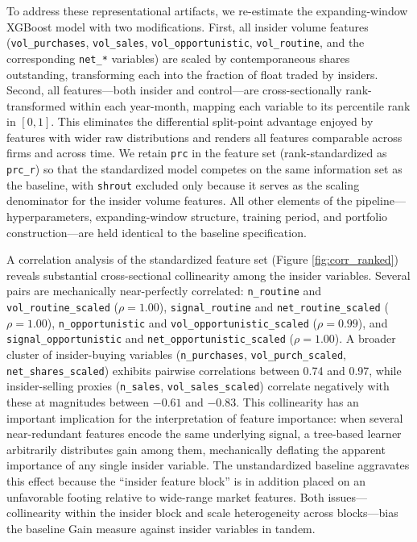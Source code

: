 \documentclass{article}
\begin{document}
To address these representational artifacts, we re-estimate the expanding-window XGBoost model with two modifications. First, all insider volume features (\texttt{vol\_purchases}, \texttt{vol\_sales}, \texttt{vol\_opportunistic}, \texttt{vol\_routine}, and the corresponding \texttt{net\_*} variables) are scaled by contemporaneous shares outstanding, transforming each into the fraction of float traded by insiders. Second, all features---both insider and control---are cross-sectionally rank-transformed within each year-month, mapping each variable to its percentile rank in $[0,1]$. This eliminates the differential split-point advantage enjoyed by features with wider raw distributions and renders all features comparable across firms and across time. We retain \texttt{prc} in the feature set (rank-standardized as \texttt{prc\_r}) so that the standardized model competes on the same information set as the baseline, with \texttt{shrout} excluded only because it serves as the scaling denominator for the insider volume features. All other elements of the pipeline---hyperparameters, expanding-window structure, training period, and portfolio construction---are held identical to the baseline specification.

A correlation analysis of the standardized feature set (Figure \ref{fig:corr_ranked}) reveals substantial cross-sectional collinearity among the insider variables. Several pairs are mechanically near-perfectly correlated: \texttt{n\_routine} and \texttt{vol\_routine\_scaled} ($\rho = 1.00$), \texttt{signal\_routine} and \texttt{net\_routine\_scaled} ($\rho = 1.00$), \texttt{n\_opportunistic} and \texttt{vol\_opportunistic\_scaled} ($\rho = 0.99$), and \texttt{signal\_opportunistic} and \texttt{net\_opportunistic\_scaled} ($\rho = 1.00$). A broader cluster of insider-buying variables (\texttt{n\_purchases}, \texttt{vol\_purch\_scaled}, \texttt{net\_shares\_scaled}) exhibits pairwise correlations between 0.74 and 0.97, while insider-selling proxies (\texttt{n\_sales}, \texttt{vol\_sales\_scaled}) correlate negatively with these at magnitudes between $-0.61$ and $-0.83$. This collinearity has an important implication for the interpretation of feature importance: when several near-redundant features encode the same underlying signal, a tree-based learner arbitrarily distributes gain among them, mechanically deflating the apparent importance of any single insider variable. The unstandardized baseline aggravates this effect because the ``insider feature block'' is in addition placed on an unfavorable footing relative to wide-range market features. Both issues---collinearity within the insider block and scale heterogeneity across blocks---bias the baseline Gain measure against insider variables in tandem.
\end{document}
